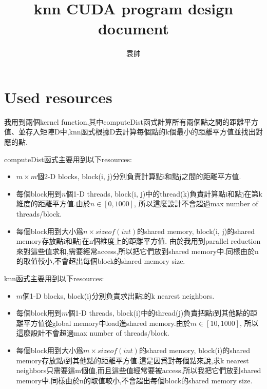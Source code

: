 \documentclass[a4paper]{article}
\title{knn CUDA program design document}
\author{袁帥}
\date{}
\begin{document}
\maketitle

\section{Used resources}
我用到兩個kernel function,其中computeDist函式計算所有兩個點之間的距離平方值、並存入矩陣D中,knn函式根據D去計算每個點的k個最小的距離平方值並找出對應的點.

computeDist函式主要用到以下resources:
\begin{itemize}
  \item $m \times m$個2-D blocks, block(i, j)分別負責計算點i和點j之間的距離平方值.
  \item 每個block用到$n$個1-D threads, block(i, j)中的thread(k)負責計算點i和點j在第k維度的距離平方值.由於$n \in [0, 1000]$, 所以這麼設計不會超過max number of threads/block.
  \item 每個block用到大小爲$n \times sizeof(int)$的shared memory, block(i, j)的shared memory存放點i和點j在n個維度上的距離平方值. 由於我用到parallel reduction來對這些值求和,需要經常access,所以把它們放到shared memory中.同樣由於n的取值較小,不會超出每個block的shared memory size.
\end{itemize}

knn函式主要用到以下resources:
\begin{itemize}
  \item $m$個1-D blocks, block(i)分別負責求出點i的k nearest neighbors.
  \item 每個block用到$m$個1-D threads, block(i)中的thread(j)負責把點i到其他點的距離平方值從global memory中load進shared memory.由於$m \in [10, 1000]$, 所以這麼設計不會超過max number of threads/block.
  \item 每個block用到大小爲$m \times sizeof(int)$的shared memory, block(i)的shared memory存放點i到其他點的距離平方值.這是因爲對每個點來說,求k nearest neighbors只需要這m個值,而且這些值經常要被access,所以我把它們放到shared memory中.同樣由於n的取值較小,不會超出每個block的shared memory size.
\end{itemize}
\end{document}
